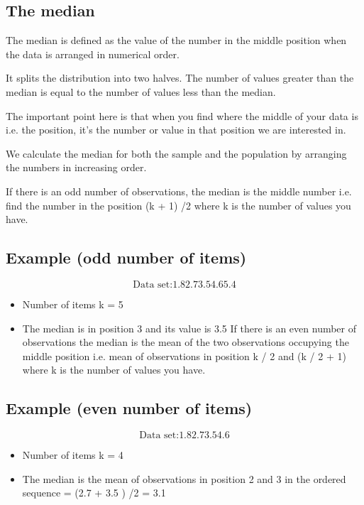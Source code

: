 \subsection{The median}
 
The median is defined as the value of the number in the middle position when the data is arranged in numerical order.
 
It splits the distribution into two halves. The number of values greater than the median is equal to the number of values less than the median.

The important point here is that when you find where the middle of your data is i.e. the position, it’s the number or value in that position we are interested in.

We calculate the median for both the sample and the population by arranging the numbers in increasing order. 

If there is an odd number of observations, the median is the middle number i.e. find the number in the position (k + 1) /2 where k is the number of values you have.

\subsection{Example (odd number of items)}

\[ \mbox{Data set:}  1.8   2.7   3.5   4.6   5.4\]


\begin{itemize}
\item Number of items k = 5       

\item The median is in position 3 and its value  is 3.5
If there is an even number of observations the median is the mean of the two observations occupying the middle position i.e. mean of observations in position k / 2 and  (k / 2  + 1) where k is the number of values you have.
\end{itemize}

\subsection{Example (even number of items)}

\[ \mbox{Data set:}    1.8   2.7   3.5   4.6  \]

\begin{itemize}
\item Number of items k = 4       
\item The median is the mean of observations in position  2 and 3 in the ordered sequence  = (2.7 + 3.5 ) /2   = 3.1
\end{itemize}




